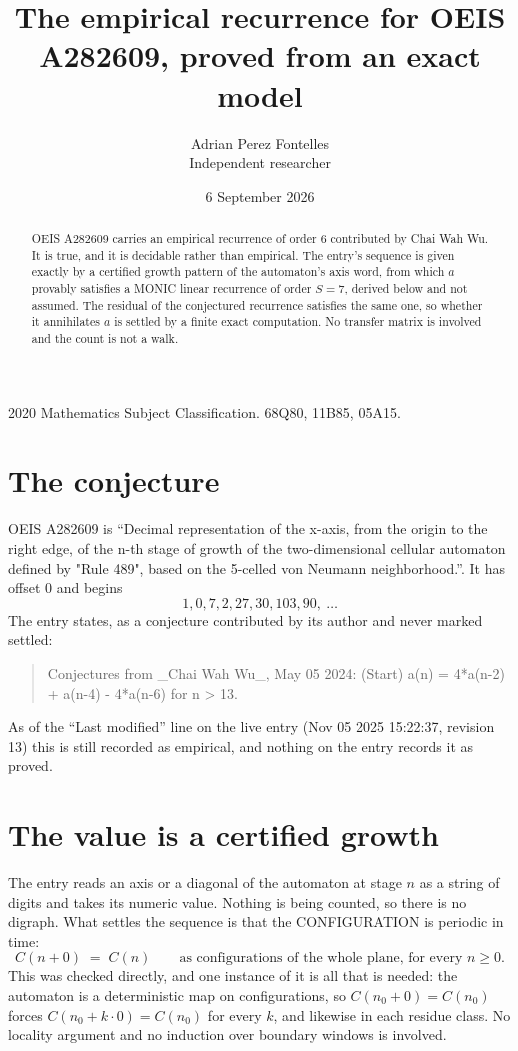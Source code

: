 \documentclass[11pt,a4paper]{article}
\title{The empirical recurrence for OEIS A282609, proved from an exact model}
\author{Adrian Perez Fontelles\\ \small Independent researcher}
\date{6 September 2026}
\theoremstyle{plain}
\theoremstyle{definition}
\begin{document}
\maketitle

\begin{abstract}
OEIS A282609 carries an empirical recurrence of order $6$ contributed by Chai Wah Wu. It is true, and it is
decidable rather than empirical. The entry's sequence is given exactly by a certified growth pattern of the automaton's axis word, from
which $a$ provably satisfies a MONIC linear recurrence of order $S=7$, derived below and not
assumed. The residual of the conjectured recurrence satisfies the same one, so whether it
annihilates $a$ is settled by a finite exact computation. No transfer matrix is involved and
the count is not a walk.
\end{abstract}

\noindent\small 2020 Mathematics Subject Classification. 68Q80, 11B85, 05A15.\normalsize

\section{The conjecture}

OEIS A282609 is ``Decimal representation of the x-axis, from the origin to the right edge, of the n-th stage of growth of the two-dimensional cellular automaton defined by "Rule 489", based on the 5-celled von Neumann neighborhood.''. It has offset $0$ and begins
\[
1, 0, 7, 2, 27, 30, 103, 90,\ \dots
\]
The entry states, as a conjecture contributed by its author and never marked settled:
\begin{quote}
Conjectures from \_Chai Wah Wu\_, May 05 2024: (Start) a(n) = 4*a(n-2) + a(n-4) - 4*a(n-6) for n > 13.
\end{quote}
As of the ``Last modified'' line on the live entry (Nov 05 2025 15:22:37, revision 13)
this is still recorded as empirical, and nothing on the entry records it as proved.

\section{The value is a certified growth}

The entry reads an axis or a diagonal of the automaton at stage $n$ as a string of digits and
takes its numeric value. Nothing is being counted, so there is no digraph. What settles the
sequence is that the CONFIGURATION is periodic in time:
\[
C(n+0)\;=\;C(n)\qquad\text{as configurations of the whole plane, for every } n\ge 0.
\]
This was checked directly, and one instance of it is all that is needed: the automaton is a
deterministic map on configurations, so $C(n_0+0)=C(n_0)$ forces $C(n_0+k\cdot0)=C(n_0)$ for
every $k$, and likewise in each residue class. No locality argument and no induction over
boundary windows is involved.
\end{document}
